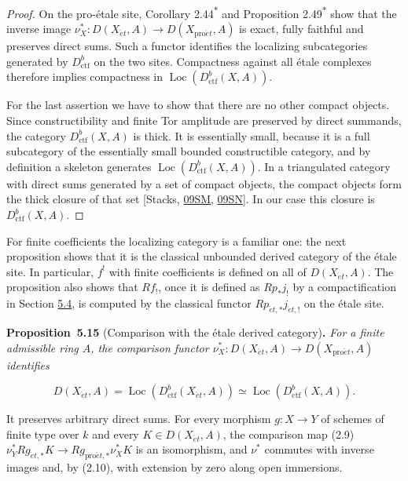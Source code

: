 \documentclass[11pt]{article}
\newenvironment{bpstatement}[2]{\par\addvspace{0.6\baselineskip}\noindent\textbf{#1}#2\textbf{.}\enspace\ignorespaces}
  {\par\addvspace{0.4\baselineskip}}
\newenvironment{bpstatementit}[2]{\begin{bpstatement}{#1}{#2}\itshape\ignorespaces}{\end{bpstatement}}
\newcommand{\bpout}[1]{#1\textsuperscript{\hyperlink{bp-outside}{\ensuremath{\ast}}}}
\providecommand{\Loc}{}\renewcommand{\Loc}{\operatorname{Loc}}
\begin{document}
\begin{proof}[{Proof}]
On the pro-étale site, Corollary \bpout{2.44} and Proposition \bpout{2.49} show that the inverse image \(\nu_X^*:D(X_{\acute{e}t},A)\to D(X_{\mathrm{pro}\acute{e}t},A)\) is exact, fully faithful and preserves direct sums. Such a functor identifies the localizing subcategories generated by \(D^b_{\mathrm{ctf}}\) on the two sites. Compactness against all étale complexes therefore implies compactness in \(\Loc(D^b_{\mathrm{ctf}}(X,A))\).

For the last assertion we have to show that there are no other compact objects. Since constructibility and finite Tor amplitude are preserved by direct summands, the category \(D^b_{\mathrm{ctf}}(X,A)\) is thick. It is essentially small, because it is a full subcategory of the essentially small bounded constructible category, and by definition a skeleton generates \(\Loc(D^b_{\mathrm{ctf}}(X,A))\). In a triangulated category with direct sums generated by a set of compact objects, the compact objects form the thick closure of that set [Stacks, \href{https://stacks.math.columbia.edu/tag/09SM}{09SM}, \href{https://stacks.math.columbia.edu/tag/09SN}{09SN}]. In our case this closure is \(D^b_{\mathrm{ctf}}(X,A)\).
\end{proof}

\label{bp47}%
For finite coefficients the localizing category is a familiar one: the next proposition shows that it is the classical unbounded derived category of the étale site. In particular, \(f^!\) with finite coefficients is defined on all of \(D(X_{\acute{e}t},A)\). The proposition also shows that \(Rf_!\), once it is defined as \(Rp_*j_!\) by a compactification in Section \hyperref[bp53]{5.4}, is computed by the classical functor \(Rp_{\acute{e}t,*}j_{\acute{e}t,!}\) on the étale site.

\label{bp48}%
\begin{bpstatementit}{Proposition~5.15}{ (Comparison with the étale derived category)}
For a finite admissible ring \(A\), the comparison functor \(\nu_X^*:D(X_{\acute{e}t},A)\to D(X_{\mathrm{pro}\acute{e}t},A)\) identifies

\[
D(X_{\acute{e}t},A)=\Loc(D^b_{\mathrm{ctf}}(X_{\acute{e}t},A))
\simeq\Loc(D^b_{\mathrm{ctf}}(X,A)).
\]

It preserves arbitrary direct sums. For every morphism \(g:X\to Y\) of schemes of finite type over \(k\) and every \(K\in D(X_{\acute{e}t},A)\), the comparison map (2.9) \(\nu_Y^*Rg_{\acute{e}t,*}K\to Rg_{\mathrm{pro}\acute{e}t,*}\nu_X^*K\) is an isomorphism, and \(\nu^*\) commutes with inverse images and, by (2.10), with extension by zero along open immersions.
\end{bpstatementit}
\end{document}
